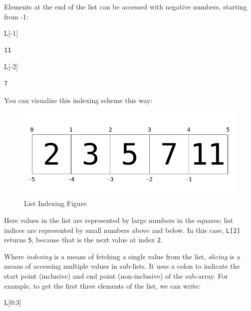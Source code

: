 \documentclass[]{article}
\newenvironment{Shaded}{}{}
\newcommand{\DecValTok}[1]{\textcolor[rgb]{0.25,0.63,0.44}{{#1}}}
\newcommand{\OperatorTok}[1]{\textcolor[rgb]{0.40,0.40,0.40}{{#1}}}
\newcommand{\NormalTok}[1]{{#1}}
\begin{document}
Elements at the end of the list can be accessed with negative numbers,
starting from -1:

\begin{Shaded}
\begin{Highlighting}[]
\NormalTok{L[}\OperatorTok{-}\DecValTok{1}\NormalTok{]}
\end{Highlighting}
\end{Shaded}

\begin{verbatim}
11
\end{verbatim}

\begin{Shaded}
\begin{Highlighting}[]
\NormalTok{L[}\OperatorTok{-}\DecValTok{2}\NormalTok{]}
\end{Highlighting}
\end{Shaded}

\begin{verbatim}
7
\end{verbatim}

You can visualize this indexing scheme this way:

\begin{figure}[htbp]
\centering
\includegraphics{fig/list-indexing.png}
\caption{List Indexing Figure}
\end{figure}

Here values in the list are represented by large numbers in the squares;
list indices are represented by small numbers above and below. In this
case, \texttt{L{[}2{]}} returns \texttt{5}, because that is the next
value at index \texttt{2}.

Where \emph{indexing} is a means of fetching a single value from the
list, \emph{slicing} is a means of accessing multiple values in
sub-lists. It uses a colon to indicate the start point (inclusive) and
end point (non-inclusive) of the sub-array. For example, to get the
first three elements of the list, we can write:

\begin{Shaded}
\begin{Highlighting}[]
\NormalTok{L[}\DecValTok{0}\NormalTok{:}\DecValTok{3}\NormalTok{]}
\end{Highlighting}
\end{Shaded}
\end{document}

